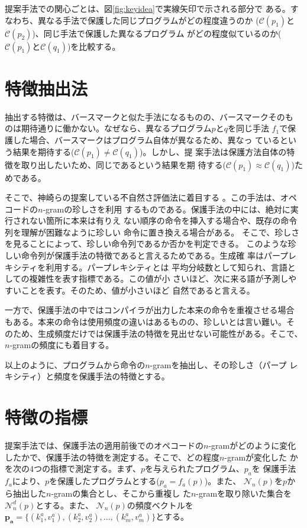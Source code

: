 \documentclass[12pt,twoside]{jreport}
\newcommand{\birth}[1]{\mathcal{C}(#1)}
\newcommand{\distinct}[1]{\mathcal{N}_n^d(#1)}
\begin{document}
提案手法での関心ごとは、図\ref{fig:keyidea}で実線矢印で示される部分で
ある。すなわち、異なる手法で保護した同じプログラムがどの程度違うのか
($\birth{p_1}$と$\birth{p_2}$)、同じ手法で保護した異なるプログラム
がどの程度似ているのか($\birth{p_1}$と$\birth{q_1}$)を比較する。

\section{特徴抽出法}\label{sect:artificiality}

抽出する特徴は、バースマークと似た手法になるものの、バースマークそのも
のは期待通りに働かない。なぜなら、異なるプログラム$p$と$q$を同じ手法
$f_1$で保護した場合、バースマークはプログラム自体が異なるため、異なっ
ているという結果を期待する($\birth{p_1} \neq \birth{q_1}$)。しかし、提
案手法は保護方法自体の特徴を取り出したいため、同じであるという結果を期
待する($\birth{p_1} \approx \birth{q_1}$)ためである。

そこで、神崎らの提案している不自然さ評価法に着目する
\cite{kanzaki14ipsj}。この手法は、オペコードの$n$-gramの珍しさを利用
するものである。保護手法の中には、絶対に実行されない箇所に本来は有りえ
ない順序の命令を挿入する場合や、既存の命令列を理解が困難なように珍しい
命令に置き換える場合がある。
%
そこで、珍しさを見ることによって、珍しい命令列であるか否かを判定できる。
このような珍しい命令列が保護手法の特徴であると言えるためである。生成確
率はパープレキシティを利用する\cite{gekka14scis}。パープレキシティとは
平均分岐数として知られ、言語としての複雑性を表す指標である。この値が小
さいほど、次に来る語が予測しやすいことを表す。そのため、値が小さいほど
自然であると言える。

一方で、保護手法の中ではコンパイラが出力した本来の命令を重複させる場合
もある。本来の命令は使用頻度の違いはあるものの、珍しいとは言い難い。そ
のため、生成頻度だけでは保護手法の特徴を見出せない可能性がある。そこで、
$n$-gramの頻度にも着目する。

以上のように、プログラムから命令の$n$-gramを抽出し、その珍しさ（パープ
  レキシティ）と頻度を保護手法の特徴とする。

\section{特徴の指標}\label{sect:index}

提案手法では、保護手法の適用前後でのオペコードの$n$-gramがどのように変化
したかで、保護手法の特徴を測定する。そこで、どの程度$n$-gramが変化した
かを次の4つの指標で測定する。まず、$p$を与えられたプログラム、$p_a$を
保護手法$f_a$により、$p$を保護したプログラムとする($p_a=f_a(p)$)。また、
$\mathcal{N}_n(p)$を$p$から抽出した$n$-gramの集合とし、そこから重複し
た$n$-gramを取り除いた集合を$\distinct{p}$とする。また、
$\mathcal{N}_n(p)$の頻度ベクトルを$\bm{p_a}=\{ (k^a_1, v^a_1), (k^a_2,
v^a_2), ..., (k^a_m, v^a_m) \}$とする。
\end{document}
